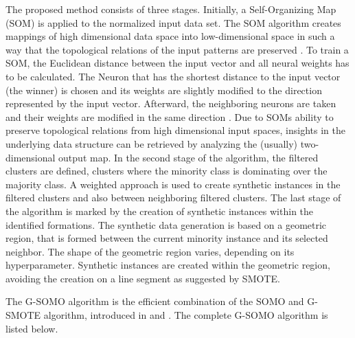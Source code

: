 \documentclass[parskip=full]{scrartcl}
\begin{document}
The proposed method consists of three stages. Initially, a Self-Organizing Map (SOM) is applied to the normalized input data set. The SOM algorithm creates mappings of high dimensional data space into low-dimensional space in such a way that the topological relations of the input patterns are preserved \cite{KOKUER2007}. To train a SOM, the Euclidean distance between the input vector and all neural weights has to be calculated. The Neuron that has the shortest distance to the input vector (the winner) is chosen and its weights are slightly modified to the direction represented by the input vector. Afterward, the neighboring neurons are taken and their weights are modified in the same direction \cite{Brocki2007}. Due to SOMs ability to preserve topological relations from high dimensional input spaces, insights in the underlying data structure can be retrieved by analyzing the (usually) two-dimensional output map. In the second stage of the algorithm, the filtered clusters are defined, clusters where the minority class is dominating over the majority class. A weighted approach is used to create synthetic instances in the filtered clusters and also between neighboring filtered clusters. The last stage of the algorithm is marked by the creation of synthetic instances within the identified formations. The synthetic data generation is based on a geometric region, that is formed between the current minority instance and its selected neighbor. The shape of the geometric region varies, depending on its hyperparameter. Synthetic instances are created within the geometric region, avoiding the creation on a line segment as suggested by SMOTE. 

The G-SOMO algorithm is the efficient combination of the SOMO and G-SMOTE algorithm, introduced in \cite{Douzas2017B} and \cite{Douzas2017}. The complete G-SOMO algorithm is listed below.
\end{document}
